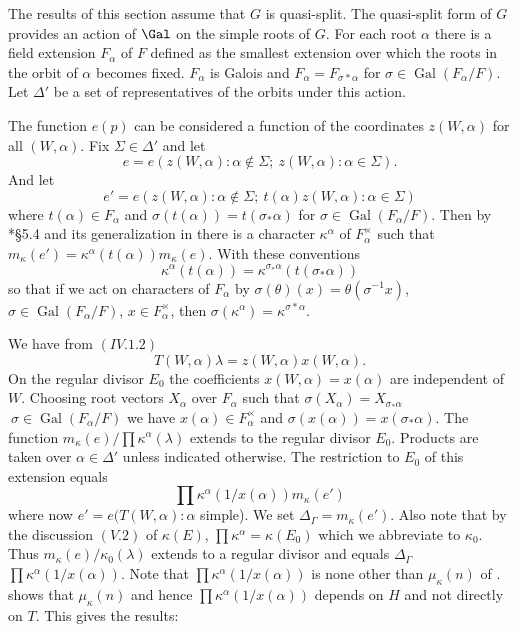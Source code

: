 \documentclass{memo-l}
\theoremstyle{definition}
\theoremstyle{remark}
\numberwithin{section}{chapter}
\numberwithin{equation}{chapter}
\begin{document}
   The results of this section assume that $G$ is quasi-split.  The
quasi-split form of $G$ provides an action of $\Gal$ on the
simple roots of $G$.  For each root ${\alpha}$ there is a field extension
$F_{{\alpha}}$ of $F$ defined as the smallest extension over which the
roots in the orbit of ${\alpha}$ becomes fixed.  $F_{{\alpha}}$ is Galois
and $F_{{\alpha}}  =  F_{{\sigma}*{\alpha}}$ for ${\sigma}  \in
\operatorname{Gal}(F_{{\alpha}}/F)$.  Let ${\Delta}'$ be a set of representatives of the
orbits under this action.

   The function $e(p)$ can be considered a function of the coordinates
$z(W,{\alpha})$ for all $(W,{\alpha})$.  Fix ${\Sigma}  \in  {\Delta}'$ and
let
$$
e  =
e(z(W,{\alpha}):{\alpha \notin \Sigma};\ z(W,{\alpha}): {\alpha \in \Sigma}).
$$
And let
$$
e'  =
e(z(W,{\alpha}):{\alpha  \notin  \Sigma};\
t({\alpha})z(W,{\alpha}): {\alpha  \in  \Sigma})
$$
where $t({\alpha})  \in  F_{{\alpha}}$ and
${\sigma}(t({\alpha})) = t({\sigma}_{*}{\alpha})$ for ${\sigma}  \in
\operatorname{Gal}(F_{{\alpha}}/F)$.  Then by \cite{MR701566}*{\S5.4} and its generalization in
\cite{MR909227} there is a character ${\kappa}^{{\alpha}}$ of $F_{{\alpha}}^{\times}$
such that
$m_{{\kappa}}(e') = {\kappa}^{{\alpha}}(t({\alpha}))m_{{\kappa}}(e)$.  With
these conventions
$${\kappa}^{{\alpha}}(t({\alpha})) = {\kappa}^{\sigma_*\alpha}(t(\sigma_*\alpha))$$
so that if we act on characters of $F_{{\alpha}}$ by ${\sigma}({\theta})(x)
 =  {\theta}({\sigma}^{-1}x)$,\
${\sigma}  \in  \operatorname{Gal}(F_{{\alpha}}/F)$,
$x  \in F_{{\alpha}}^{\times}$,
then ${\sigma}({\kappa}^{{\alpha}})  =
{\kappa}^{{\sigma}*{\alpha}}$.


We have from $(IV.1.2)$
$$
T(W,{\alpha}){\lambda}  =  z(W,{\alpha})x(W,{\alpha}) .
$$
On the regular divisor $E_{0}$ the coefficients $x(W,{\alpha}) = x({\alpha})$
are independent of $W$.  Choosing root vectors $X_{{\alpha}}$ over
$F_{{\alpha}}$ such that ${\sigma}(X_{{\alpha}}) = X_{{\sigma}_*{\alpha}}$
$\ {\sigma}  \in  \operatorname{Gal}(F_{{\alpha}}/F)$ we have $x({\alpha})  \in
F_{{\alpha}}^{\times}$ and ${\sigma}(x({\alpha}))  =  x({\sigma}_{*}{\alpha})$.
The function $m_{{\kappa}}(e)/ \prod{\kappa}^{{\alpha}}({\lambda})$ extends
to the regular divisor $E_{0}$.  Products are taken over ${\alpha}  \in
{\Delta}'$ unless indicated otherwise.  The restriction to $E_{0}$ of this
extension equals
$$
\prod {\kappa}^{{\alpha}}(1/x({\alpha}))m_{{\kappa}}(e')
$$
where now $e' = e(T(W,{\alpha}):{\alpha}$ simple).  We set
${\Delta}_{{\Gamma}}  =  m_{{\kappa}}(e')$.  Also note that by the discussion
$(V.2)$ of ${\kappa}(E)$, $\prod{\kappa}^{{\alpha}}  =  {\kappa}(E_{0})$
which we abbreviate to ${\kappa}_{0}$.  Thus
$m_{{\kappa}}(e)/{\kappa}_{0}({\lambda})$ extends to a regular divisor and
equals ${\Delta}_{{\Gamma}}$ $\prod{\kappa}^{{\alpha}}(1/x({\alpha}))$.
Note that $\prod{\kappa}^{{\alpha}}(1/x({\alpha}))$ is none other than
${\mu}_{{\kappa}}(n)$ of \cite{MR701566}.  \cite{MR701566} shows that ${\mu}_{{\kappa}}(n)$
and hence $\prod{\kappa}^{{\alpha}}(1/x({\alpha}))$ depends on $H$ and not
directly on $T$.  This gives the results:
\end{document}
